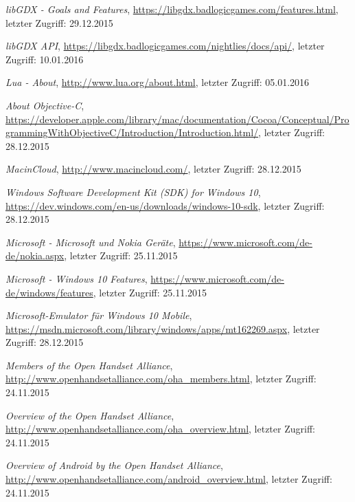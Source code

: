 \begin{thebibliography}{}
\emph{libGDX - Goals and Features},
\url{https://libgdx.badlogicgames.com/features.html}, letzter Zugriff: 29.12.2015

\emph{libGDX API},
\url{https://libgdx.badlogicgames.com/nightlies/docs/api/}, letzter Zugriff: 10.01.2016

\emph{Lua - About},
\url{http://www.lua.org/about.html}, letzter Zugriff: 05.01.2016

\emph{About Objective-C},
\url{https://developer.apple.com/library/mac/documentation/Cocoa/Conceptual/ProgrammingWithObjectiveC/Introduction/Introduction.html/}, letzter Zugriff: 28.12.2015

\emph{MacinCloud},
\url{http://www.macincloud.com/}, letzter Zugriff: 28.12.2015

\emph{Windows Software Development Kit (SDK) for Windows 10},
\url{https://dev.windows.com/en-us/downloads/windows-10-sdk}, letzter Zugriff: 28.12.2015

\emph{Microsoft - Microsoft und Nokia Geräte},
\url{https://www.microsoft.com/de-de/nokia.aspx}, letzter Zugriff: 25.11.2015

\emph{Microsoft - Windows 10 Features},
\url{https://www.microsoft.com/de-de/windows/features}, letzter Zugriff: 25.11.2015

\emph{Microsoft-Emulator für Windows 10 Mobile},
\url{https://msdn.microsoft.com/library/windows/apps/mt162269.aspx}, letzter Zugriff: 28.12.2015

\emph{Members of the Open Handset Alliance},
\url{http://www.openhandsetalliance.com/oha_members.html}, letzter Zugriff: 24.11.2015

\emph{Overview of the Open Handset Alliance},
\url{http://www.openhandsetalliance.com/oha_overview.html}, letzter Zugriff: 24.11.2015

\emph{Overview of Android by the Open Handset Alliance},
\url{http://www.openhandsetalliance.com/android_overview.html}, letzter Zugriff: 24.11.2015


\end{thebibliography}
